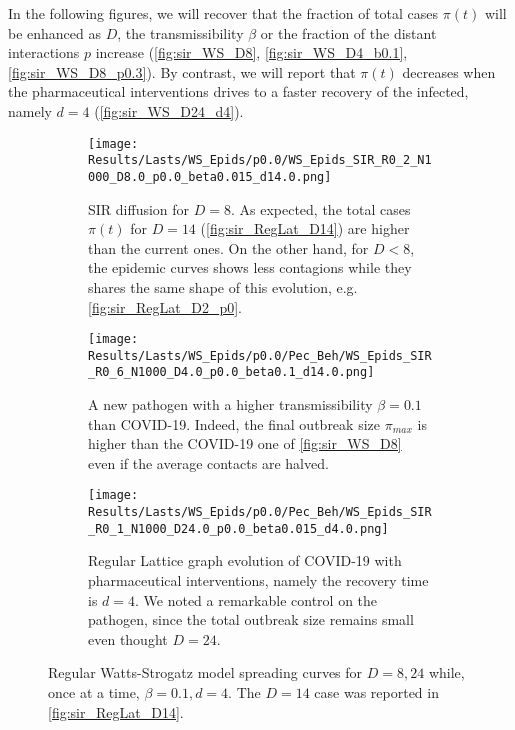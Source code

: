 \documentclass[a4paper,10pt,twoside]{book} %
\theoremstyle{definition}
\begin{document}
In the following figures, we will recover that the fraction of total cases $\pi(t)$ will be enhanced as $ D$, the transmissibility $ \beta$ or the fraction of the distant interactions $ p$ increase (\autoref{fig:sir_WS_D8}, \autoref{fig:sir_WS_D4_b0.1}, \autoref{fig:sir_WS_D8_p0.3}). By contrast, we will report that $ \pi(t)$ decreases when the pharmaceutical interventions drives to a faster recovery of the infected, namely $ d = 4$ (\autoref{fig:sir_WS_D24_d4}).

\begin{figure}[hbtp]
    \centering
	\begin{subfigure}[t]{\textwidth}
        \centering
        \texttt{[image: Results/Lasts/WS\_Epids/p0.0/WS\_Epids\_SIR\_R0\_2\_N1000\_D8.0\_p0.0\_beta0.015\_d14.0.png]} 
        \caption{SIR diffusion for $ D = 8$. As expected, the total cases $ \pi(t)$ for $ D = 14$   (\autoref{fig:sir_RegLat_D14}) are higher than the current ones. On the other hand, for $ D < 8$, the epidemic curves shows less contagions while they shares the same shape of this evolution, e.g. \autoref{fig:sir_RegLat_D2_p0}.} 
		\label{fig:sir_WS_D8}
	\end{subfigure}
	\vfill
    \begin{subfigure}[t]{\textwidth}
        \centering
        \texttt{[image: Results/Lasts/WS\_Epids/p0.0/Pec\_Beh/WS\_Epids\_SIR\_R0\_6\_N1000\_D4.0\_p0.0\_beta0.1\_d14.0.png]} 
        \caption{A new pathogen with a higher transmissibility $ \beta = 0.1$ than COVID-19. Indeed, the final outbreak size $\pi_{max} $ is higher than the COVID-19 one of \autoref{fig:sir_WS_D8} even if the average contacts are halved.} 
		\label{fig:sir_WS_D4_b0.1}
    \end{subfigure}
	\vfill
    \begin{subfigure}[t]{\textwidth}
        \centering
        \texttt{[image: Results/Lasts/WS\_Epids/p0.0/Pec\_Beh/WS\_Epids\_SIR\_R0\_1\_N1000\_D24.0\_p0.0\_beta0.015\_d4.0.png]} 
        \caption{Regular Lattice graph evolution of COVID-19 with pharmaceutical interventions, namely the recovery time is $ d = 4$. We noted a remarkable control on the pathogen, since the total outbreak size remains small even thought $ D = 24$.} 
		\label{fig:sir_WS_D24_d4}
    \end{subfigure}
    \caption{Regular Watts-Strogatz model spreading curves for $D = 8, 24$ while, once at a time, $ \beta = 0.1, d = 4$. The $ D = 14$ case was reported in \autoref{fig:sir_RegLat_D14}.}
	\label{fig:sir_WS_D5D5b0.1_D24d4}
\end{figure}
\end{document}
